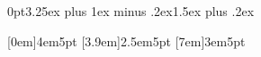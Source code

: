 \titlespacing*{\subsection} {0pt}{3.25ex plus 1ex minus .2ex}{1.5ex plus .2ex}  
\titleformat{\subsubsection}[hang]{\hei \sf\color{black}}{\color{black}\thesubsubsection }{0.5em}{}{}
\titlespacing{\subsubsection}{0pt}{0.25em}{0pt}


[0em]{\addvspace{1.5em}\hei\color{black}}{4em}{5pt}
[3.9em]{\addvspace{0.0em}}{2.5em}{5pt}
[7em]{\addvspace{0.0em}}{3em}{5pt}



\makeatletter\let\ps@plain\ps@empty\makeatother      %



\renewcommand{\headrule}{{\color{black}\hrule width\headwidth height\headrulewidth \vskip-\headrulewidth}}



\pagestyle{fancy}
\renewcommand{\chaptermark}[1]{\markboth{\chaptername\quad #1}{}}    %
\renewcommand{\sectionmark}[1]{\markright{\thesection\quad #1}{}}    %
\fancyhf{} %

